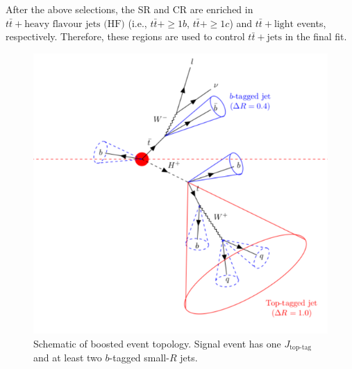 After the above selections, the SR and CR are enriched in $t\bar{t}+\text{heavy flavour jets (HF)}$ (i.e., $t\bar{t}+\geq1b$, $t\bar{t}+\geq1c$) and $t\bar{t}+\text{light}$ events, respectively. Therefore, these regions are used to control $t\bar{t}+\text{jets}$ in the final fit. 

\begin{figure}[H]
  \centering
  \includegraphics[keepaspectratio,scale=0.8]{images/AnalysisStrategy/EventTopology.png}
  \caption{Schematic of boosted event topology. Signal event has one $J_{\text{top-tag}}$ and at least two $b$-tagged small-$R$ jets.}
  \label{fig:EventTopology_Htb}
\end{figure}

